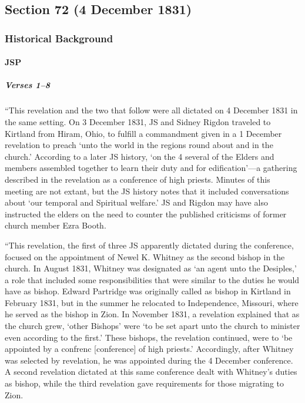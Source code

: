 \subsection{Section 72 (4 December 1831)}
	\label{DC72}
	
	\subsubsection{Historical Background}
		\label{DC72-HB}
		
		\paragraph{JSP}
		
			\subparagraph{Verses 1--8}
			
				``This revelation and the two that follow were all dictated on 4 December 1831 in the same setting. On 3 December 1831, JS and Sidney Rigdon traveled to Kirtland from Hiram, Ohio, to fulfill a commandment given in a 1 December revelation to preach `unto the world in the regions round about and in the church.' According to a later JS history, `on the 4 several of the Elders and members assembled together to learn their duty and for edification'---a gathering described in the revelation as a conference of high priests. Minutes of this meeting are not extant, but the JS history notes that it included conversations about `our temporal and Spiritual welfare.' JS and Rigdon may have also instructed the elders on the need to counter the published criticisms of former church member Ezra Booth.

				``This revelation, the first of three JS apparently dictated during the conference, focused on the appointment of Newel K. Whitney as the second bishop in the church. In August 1831, Whitney was designated as `an agent unto the Desiples,' a role that included some responsibilities that were similar to the duties he would have as bishop. Edward Partridge was originally called as bishop in Kirtland in February 1831, but in the summer he relocated to Independence, Missouri, where he served as the bishop in Zion. In November 1831, a revelation explained that as the church grew, `other Bishops' were `to be set apart unto the church to minister even according to the first.' These bishops, the revelation continued, were to `be appointed by a confrenc [conference] of high priests.' Accordingly, after Whitney was selected by revelation, he was appointed during the 4 December conference. A second revelation dictated at this same conference dealt with Whitney's duties as bishop, while the third revelation gave requirements for those migrating to Zion.

